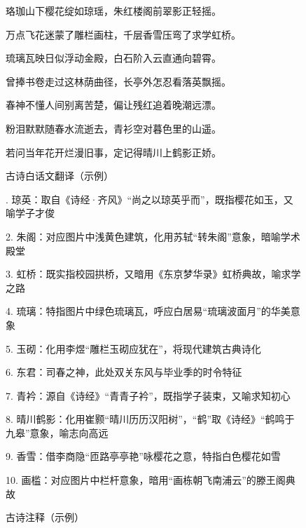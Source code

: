 \begin{figure}[ht]
  \centering
  \begin{tcolorbox}[
      colback=white,
      colframe=black,
      boxrule=1pt,
      arc=0mm,
      width=0.8\linewidth,  %
      ]
      \kaishu
      \centering
      珞珈山下樱花绽如琼瑶，朱红楼阁前翠影正轻摇。\par
      万点飞花迷蒙了雕栏画柱，千层香雪压弯了求学虹桥。\par
      琉璃瓦映日似浮动金殿，白石阶入云直通向碧霄。\par
      曾捧书卷走过这林荫曲径，长亭外怎忍看落英飘摇。\par
      春神不懂人间别离苦楚，偏让残红追着晚潮远漂。\par
      粉泪默默随春水流逝去，青衫空对暮色里的山遥。\par
      若问当年花开烂漫旧事，定记得晴川上鹤影正娇。\par
  \end{tcolorbox}
  \caption{古诗白话文翻译（示例）}
  \label{fig:example_translation} %
\end{figure}

\begin{figure}[ht]
  \begin{tcolorbox}[
      colback=white, %
      colframe=black, 
      boxrule=1pt,        %
      arc=0mm,             %
  ]. 琼英：取自《诗经·齐风》“尚之以琼英乎而”，既指樱花如玉，又喻学子才俊\par
      2. 朱阁：对应图片中浅黄色建筑，化用苏轼“转朱阁”意象，暗喻学术殿堂\par
      3. 虹桥：既实指校园拱桥，又暗用《东京梦华录》虹桥典故，喻求学之路\par
      4. 琉璃：特指图片中绿色琉璃瓦，呼应白居易“琉璃波面月”的华美意象\par
      5. 玉砌：化用李煜“雕栏玉砌应犹在”，将现代建筑古典诗化\par
      6. 东君：司春之神，此处双关东风与毕业季的时令特征\par
      7. 青衿：源自《诗经》“青青子衿”，既指学子装束，又喻求知初心\par
      8. 晴川鹤影：化用崔颢“晴川历历汉阳树”，“鹤”取《诗经》“鹤鸣于九皋”意象，喻志向高远\par
      9. 香雪：借李商隐“匝路亭亭艳”咏樱花之意，特指白色樱花如雪\par
      10. 画槛：对应图片中栏杆意象，暗用“画栋朝飞南浦云”的滕王阁典故\par
  \end{tcolorbox}
  \caption{古诗注释（示例）}
  \label{fig:example_annotation} %
\end{figure}


